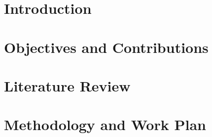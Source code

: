 \documentclass[10pt,a4paper,twoside]{report}
\begin{document}




\begin{Prolog}
\cleardoublepage

\tableofcontents



%

	
\end{Prolog}

\StartBody

\chapter{Introduction}



\chapter{Objectives and Contributions}


\chapter{Literature Review}



\newpage


\newpage


\newpage


\newpage


\newpage



%

\chapter{Methodology and Work Plan}

\end{document}
